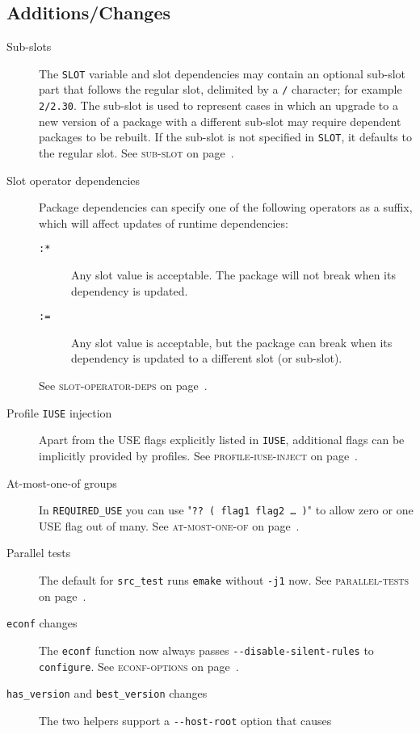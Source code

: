 \documentclass[a4paper,nofoldmark]{leaflet}
\newcommand{\code}[1]{\texttt{#1}}
\newcommand{\featureref}[1]{\textsc{#1} on page~\pageref{feat:#1}}
\begin{document}
\subsection{Additions/Changes}
\label{sec:cs:eapi5-additions}
\begin{description}
    \item[Sub-slots] The \code{SLOT} variable and slot dependencies
    may contain an optional sub-slot part that follows the regular
    slot, delimited by a \code{/} character; for example
    \code{2/2.30}.  The sub-slot is used to represent cases in which
    an upgrade to a new version of a package with a different sub-slot
    may require dependent packages to be rebuilt.  If the sub-slot is
    not specified in \code{SLOT}, it defaults to the regular slot.
    See \featureref{sub-slot}.
    \item[Slot operator dependencies] Package dependencies can specify
    one of the following operators as a suffix, which will affect
    updates of runtime dependencies:
    \begin{description}
        \item[\code{:*}] Any slot value is acceptable.  The package
        will not break when its dependency is updated.
        \item[\code{:=}] Any slot value is acceptable, but the package
        can break when its dependency is updated to a different slot
        (or sub-slot).
    \end{description}
    See \featureref{slot-operator-deps}.
    \item[Profile \code{IUSE} injection] Apart from the USE flags
    explicitly listed in \code{IUSE}, additional flags can be
    implicitly provided by profiles.
    See \featureref{profile-iuse-inject}.
    \item[At-most-one-of groups] In \code{REQUIRED_USE} you can use
    "\code{??\ ( flag1 flag2 \dots\ )}" to allow zero or one USE flag
    out of many.
    See \featureref{at-most-one-of}.
    \item[Parallel tests] The default for \code{src_test} runs
    \code{emake} without \code{-j1} now.
    See \featureref{parallel-tests}.
    \item[\code{econf} changes] The \code{econf} function now always
    passes \code{-{}-disable-silent-rules} to \code{configure}.
    See \featureref{econf-options}.
    \item[\code{has_version} and \code{best_version} changes]
    The two helpers support a \code{-{}-host-root} option that causes

\end{description}
\end{document}
